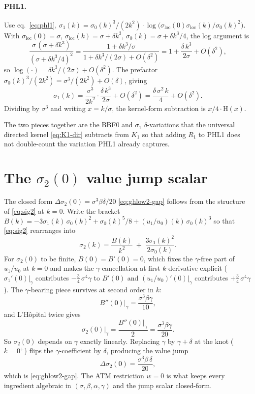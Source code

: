 \documentclass[11pt]{article}
\newcommand{\sloc}{\sigma_{\mathrm{loc}}}
\newcommand{\Hev}{\mathrm{H}}
\begin{document}
\paragraph{PHL1.} Use eq.~\eqref{eq:phl1}, $\sigma_1(k) = \sigma_0(k)^3/(2k^2)
\cdot \log\bigl(\sloc(0)\sloc(k)/\sigma_0(k)^2\bigr)$. With
$\sloc(0)=\sigma$, $\sloc(k)=\sigma+\delta k^3$,
$\sigma_0(k)=\sigma+\delta k^3/4$, the log argument is
\[
\frac{\sigma\,(\sigma+\delta k^3)}{(\sigma+\delta k^3/4)^2}
= \frac{1 + \delta k^3/\sigma}{1 + \delta k^3/(2\sigma) + O(\delta^2)}
= 1 + \frac{\delta\,k^3}{2\sigma} + O(\delta^2),
\]
so $\log(\cdot) = \delta k^3/(2\sigma) + O(\delta^2)$. The prefactor
$\sigma_0(k)^3/(2k^2) = \sigma^3/(2k^2) + O(\delta)$, giving
\[
\sigma_1(k) = \frac{\sigma^3}{2k^2}\cdot\frac{\delta\,k^3}{2\sigma} + O(\delta^2)
= \frac{\delta\,\sigma^2\,k}{4} + O(\delta^2).
\]
Dividing by $\sigma^3$ and writing $x=k/\sigma$, the kernel-form
subtraction is $x/4\cdot\Hev(x)$.

The two pieces together are the BBF0 and $\sigma_1$
$\delta$-variations that the universal directed kernel
\eqref{eq:K1-dir} subtracts from $K_1$ so that adding $R_{1}$
to PHL1 does not double-count the variation PHL1 already captures.

\section{The \texorpdfstring{$\sigma_2(0)$}{sigma\_2(0)} value jump scalar}\label{app:sig2-jump}

The closed form $\Delta\sigma_2(0) = \sigma^3\beta\delta/20$
\eqref{eq:ghlow2-gap} follows from the structure of
\eqref{eq:sig2} at $k=0$. Write the bracket
$B(k) = -3\sigma_1(k)\,\sigma_0(k)^2 + \sigma_0(k)^5/8
+ (u_1/u_0)(k)\,\sigma_0(k)^3$
so that \eqref{eq:sig2} rearranges into
\[
\sigma_2(k) = \frac{B(k)}{k^2}
\;+\; \frac{3\sigma_1(k)^2}{2\sigma_0(k)}.
\]
For $\sigma_2(0)$ to be finite, $B(0)=B'(0)=0$, which fixes the
$\gamma$-free part of $u_1/u_0$ at $k=0$ and makes the
$\gamma$-cancellation at first $k$-derivative explicit
($\sigma_1'(0)|_\gamma$ contributes $-\tfrac34\,\sigma^4\gamma$ to $B'(0)$
and $(u_1/u_0)'(0)|_\gamma$ contributes $+\tfrac34\,\sigma^4\gamma$).
The $\gamma$-bearing piece survives at second order in $k$:
\[
B''(0)\big|_\gamma = \frac{\sigma^3\beta\gamma}{10},
\]
and L'H\^opital twice gives
\[
\sigma_2(0)\big|_\gamma = \frac{B''(0)|_\gamma}{2}
= \frac{\sigma^3\beta\gamma}{20}.
\]
So $\sigma_2(0)$ depends on $\gamma$ exactly linearly. Replacing
$\gamma$ by $\gamma+\delta$ at the knot ($k=0^+$) flips the
$\gamma$-coefficient by $\delta$, producing the value jump
\[
\Delta\sigma_2(0) = \frac{\sigma^3\beta\,\delta}{20},
\]
which is \eqref{eq:ghlow2-gap}. The ATM restriction $w=0$ is what
keeps every ingredient algebraic in $(\sigma,\beta,\alpha,\gamma)$
and the jump scalar closed-form.



\end{document}
